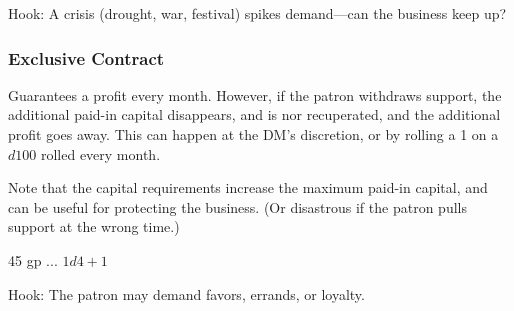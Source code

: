 \documentclass[twocolumn]{dndbook}
\begin{document}
Hook: A crisis (drought, war, festival) spikes demand—can the business keep up?\par


\subsubsection{Exclusive Contract}
Guarantees a profit every month. However, if the patron withdraws support,
the additional paid-in capital disappears, and is nor recuperated, and
the additional profit goes away. This can happen at the DM's discretion,
or by rolling a 1 on a $d100$ rolled every month.\par

Note that the capital requirements increase the maximum paid-in capital,
and can be useful for protecting the business.
(Or disastrous if the patron pulls support at the wrong time.)\par



\begin{DndComment}[color=bgtan2018]{}
	\hfill 45 gp
	\hfill ...
	\hfill $1d4 + 1$
\end{DndComment}




Hook: The patron may demand favors, errands, or loyalty.\par
\end{document}
